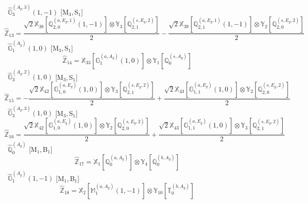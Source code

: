 \documentclass[fleqn,10pt,landscape]{article}
\begin{document}
\begin{itemize}
\begin{dmath*}
\end{dmath*}
\vspace{4mm}
\noindent {} $\,\,\,\hat{\mathbb{G}}_{3}^{(A_{g},3)}(1,-1)$ [M$_{3}$,\,S$_{1}$]
\begin{dmath*}
\hat{\mathbb{Z}}_{13}=\frac{\sqrt{2} \mathbb{X}_{38}[\mathbb{Q}_{2,0}^{(a,E_{g},1)}(1,-1)] \otimes\mathbb{Y}_{3}[\mathbb{Q}_{2,1}^{(s,E_{g},2)}]}{2} - \frac{\sqrt{2} \mathbb{X}_{39}[\mathbb{Q}_{2,1}^{(a,E_{g},1)}(1,-1)] \otimes\mathbb{Y}_{2}[\mathbb{Q}_{2,0}^{(s,E_{g},2)}]}{2}
\end{dmath*}
\vspace{4mm}
\noindent {} $\,\,\,\hat{\mathbb{G}}_{1}^{(A_{g})}(1,0)$ [M$_{3}$,\,S$_{1}$]
\begin{dmath*}
\hat{\mathbb{Z}}_{14}=\mathbb{X}_{33}[\mathbb{G}_{1}^{(a,A_{g})}(1,0)] \otimes\mathbb{Y}_{1}[\mathbb{Q}_{0}^{(s,A_{g})}]
\end{dmath*}
\vspace{4mm}
\noindent {} $\,\,\,\hat{\mathbb{G}}_{3}^{(A_{g},2)}(1,0)$ [M$_{3}$,\,S$_{1}$]
\begin{dmath*}
\hat{\mathbb{Z}}_{15}=- \frac{\sqrt{2} \mathbb{X}_{42}[\mathbb{G}_{1,0}^{(a,E_{g})}(1,0)] \otimes\mathbb{Y}_{3}[\mathbb{Q}_{2,1}^{(s,E_{g},2)}]}{2} + \frac{\sqrt{2} \mathbb{X}_{43}[\mathbb{G}_{1,1}^{(a,E_{g})}(1,0)] \otimes\mathbb{Y}_{2}[\mathbb{Q}_{2,0}^{(s,E_{g},2)}]}{2}
\end{dmath*}
\vspace{4mm}
\noindent {} $\,\,\,\hat{\mathbb{G}}_{3}^{(A_{g},3)}(1,0)$ [M$_{3}$,\,S$_{1}$]
\begin{dmath*}
\hat{\mathbb{Z}}_{16}=\frac{\sqrt{2} \mathbb{X}_{42}[\mathbb{G}_{1,0}^{(a,E_{g})}(1,0)] \otimes\mathbb{Y}_{2}[\mathbb{Q}_{2,0}^{(s,E_{g},2)}]}{2} + \frac{\sqrt{2} \mathbb{X}_{43}[\mathbb{G}_{1,1}^{(a,E_{g})}(1,0)] \otimes\mathbb{Y}_{3}[\mathbb{Q}_{2,1}^{(s,E_{g},2)}]}{2}
\end{dmath*}
\vspace{4mm}
\noindent {} $\,\,\,\hat{\mathbb{Q}}_{0}^{(A_{g})}$ [M$_{1}$,\,B$_{1}$]
\begin{dmath*}
\hat{\mathbb{Z}}_{17}=\mathbb{X}_{1}[\mathbb{Q}_{0}^{(a,A_{g})}] \otimes\mathbb{Y}_{4}[\mathbb{Q}_{0}^{(b,A_{g})}]
\end{dmath*}
\vspace{4mm}
\noindent {} $\,\,\,\hat{\mathbb{G}}_{1}^{(A_{g})}(1,-1)$ [M$_{1}$,\,B$_{1}$]
\begin{dmath*}
\hat{\mathbb{Z}}_{18}=\mathbb{X}_{2}[\mathbb{M}_{1}^{(a,A_{g})}(1,-1)] \otimes\mathbb{Y}_{10}[\mathbb{T}_{0}^{(b,A_{g})}]

\end{dmath*}
\end{itemize}
\end{document}
